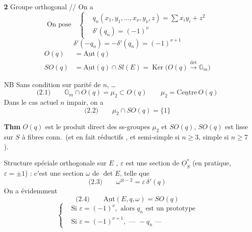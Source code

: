 \documentclass[11pt,a4paper]{article}
\begin{document}
\textbf{2} Groupe orthogonal // On a
\[
  \text{On pose} \quad
  \left\{
  \begin{aligned}
    &q_n(x_1, y_1, \ldots, x_\nu, y_\nu, z) = \textstyle\sum x_i y_i + z^2 \\
    &\delta'(q_n) = (-1)^\nu
  \end{aligned}
  \right.
\]
\[
  \delta'(-q_n) = -\delta'(q_n) = (-1)^{\nu+1}
\]
\[
\begin{aligned}
  O(q) &= \underline{\mathrm{Aut}}(q) \\
  SO(q) &= \underline{\mathrm{Aut}}(q) \cap Sl(E) = \operatorname{Ker}\bigl(O(q) \xrightarrow{\det} \mathbb{G}_m\bigr)
\end{aligned}
\]

NB Sans condition sur parité de $n$, …
\[
  \text{(2.1)} \qquad \mathbb{G}_m \cap O(q) = \mu_2 \subset O(q)
  \qquad \mu_2 = \underline{\mathrm{Centre}}\, O(q)
\]
Dans le cas actuel $n$ impair, on a
\[
  \text{(2.2)} \qquad \mu_2 \cap SO(q) = \{1\}
\]

\textbf{Thm} $O(q)$ est le produit direct des ss-groupes $\mu_2$ et $SO(q)$,
$SO(q)$ est lisse sur $S$ à fibres conn.\ (et en fait \struck{\ill{}}
réductifs , \struck{\ill{}} 
et semi-simple si $n \geqslant 3$, simple si $n \geqslant 7$).

Structure spéciale orthogonale sur $E$ ,
\struck{\ill{}}  $\varepsilon$ est une section de $\underline{O}_S^{*}$ (en pratique,
$\varepsilon = \pm 1$) : c'est une section  $\omega$ de $\det E$, telle que
\[
  \text{(2.3)} \qquad \boxed{\omega^{\otimes -2} = \varepsilon\, \delta'(q)}
\]
On a évidemment
\[
  \text{(2.4)} \qquad \underline{\mathrm{Aut}}(E, q, \omega) = SO(q)
\]
\[
\left\{
\begin{aligned}
  &\text{Si } \varepsilon = (-1)^\nu, \text{ alors } q_n \text{ est un prototype} \\
  &\text{Si } \varepsilon = (-1)^{\nu+1}, \text{ — } -q_n \text{ —}
\end{aligned}
\right.
\]
\end{document}
